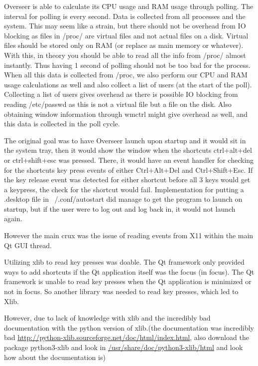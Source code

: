 \documentclass[12pt]{article}
\begin{document}
Overseer is able to calculate its CPU usage and RAM usage through polling.
The interval for polling is every second.
Data is collected from all processes and the system.
This may seem like a strain, but there should not be overhead from IO blocking as files in /proc/ are virtual files and not actual files on a disk. Virtual files should be stored only on RAM (or replace as main memory or whatever).
With this, in theory you should be able to read all the info from /proc/ almost instantly.
Thus having 1 second of polling should not be too bad for the process.
When all this data is collected from /proc, we also perform our CPU and RAM usage calculations as well and also collect a list of users (at the start of the poll).
Collecting a list of users gives overhead as there is possible IO blocking from reading /etc/passwd as this is not a virtual file but a file on the disk.
Also obtaining window information through wmctrl might give overhead as well, and this data is collected in the poll cycle.

The original goal was to have Overseer launch upon startup and it would sit in the system tray, then it would show the window when the shortcuts ctrl+alt+del or ctrl+shift+esc was pressed.
There, it would have an event handler for checking for the shortcuts key press events of either Ctrl+Alt+Del and Ctrl+Shift+Esc.
If the key release event was detected for either shortcut before all 3 keys would get a keypress, the check for the shortcut would fail.
Implementation for putting a .desktop file in ~/.conf/autostart did manage to get the program to launch on startup, but if the user were to log out and log back in, it would not launch again.

However the main crux was the issue of reading events from X11 within the main Qt GUI thread.

Utilizing xlib to read key presses was doable.
The Qt framework only provided ways to add shortcuts if the Qt application itself was the focus (in focus).
The Qt framework is unable to read key presses when the Qt application is minimized or not in focus.
So another library was needed to read key presses, which led to Xlib.

However, due to lack of knowledge with xlib and the incredibly bad documentation with the python version of xlib.(the documentation was incredibly bad \url{http://python-xlib.sourceforge.net/doc/html/index.html}, also download the package python3-xlib and look in \url{/usr/share/doc/python3-xlib/html} and look how about the documentation is)
\end{document}

